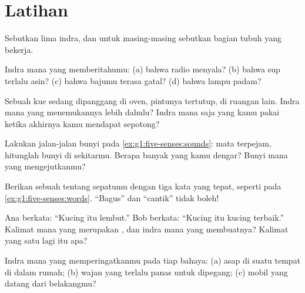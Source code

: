 \section{Latihan}

\begin{exercise}[$\star$]\label{exo:g1:five-senses:1}
Sebutkan lima indra, dan untuk masing-masing sebutkan bagian tubuh
yang bekerja.
\end{exercise}

\begin{exercise}[$\star$]\label{exo:g1:five-senses:2}
Indra mana yang memberitahumu: (a) bahwa radio menyala? (b) bahwa sup
terlalu asin? (c) bahwa bajumu terasa gatal? (d) bahwa lampu padam?
\end{exercise}

\begin{exercise}[$\star$]\label{exo:g1:five-senses:3}
Sebuah kue sedang dipanggang di oven, pintunya tertutup, di ruangan
lain. Indra mana yang menemukannya lebih dahulu? Indra mana saja yang
kamu pakai ketika akhirnya kamu mendapat sepotong?
\end{exercise}

\begin{exercise}[$\star$]\label{exo:g1:five-senses:4}
Lakukan jalan-jalan bunyi pada \cref{ex:g1:five-senses:sounds}: mata
terpejam, hitunglah bunyi di sekitarmu. Berapa banyak yang kamu
dengar? Bunyi mana yang mengejutkanmu?
\end{exercise}

\begin{exercise}[$\star$]\label{exo:g1:five-senses:5}
Berikan sebuah  tentang sepatumu dengan tiga kata yang
tepat, seperti pada \cref{ex:g1:five-senses:words}. ``Bagus'' dan
``cantik'' tidak boleh!
\end{exercise}

\begin{exercise}[$\star$]\label{exo:g1:five-senses:6}
Ana berkata: ``Kucing itu lembut.'' Bob berkata: ``Kucing itu kucing
terbaik.'' Kalimat mana yang merupakan , dan indra mana yang
membuatnya? Kalimat yang satu lagi itu apa?
\end{exercise}

\begin{exercise}[$\star$]\label{exo:g1:five-senses:7}
Indra mana yang memperingatkanmu pada tiap bahaya: (a) asap di suatu
tempat di dalam rumah; (b) wajan yang terlalu panas untuk dipegang;
(c) mobil yang datang dari belakangmu?
\end{exercise}

